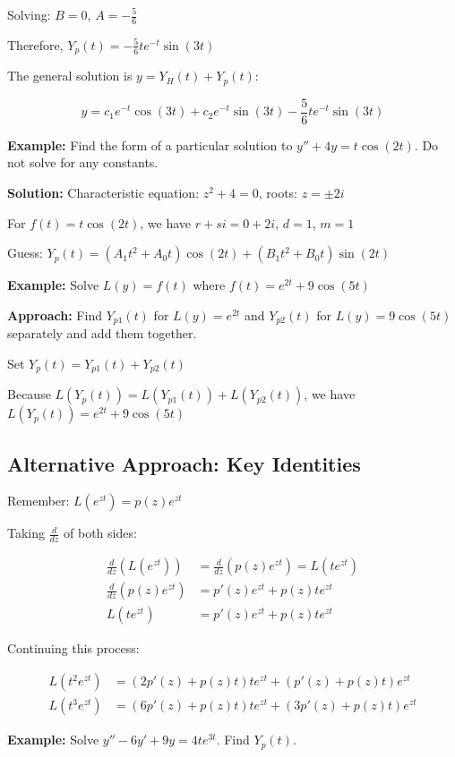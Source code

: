 \documentclass{article}
\begin{document}
Solving: $B = 0$, $A = -\frac{5}{6}$

Therefore, $Y_p(t) = -\frac{5}{6}te^{-t}\sin(3t)$

The general solution is $y = Y_H(t) + Y_p(t)$:

\[y = c_1e^{-t}\cos(3t) + c_2e^{-t}\sin(3t) - \frac{5}{6}te^{-t}\sin(3t)\]

\textbf{Example:} Find the form of a particular solution to $y''+4y = t\cos(2t)$. Do not solve for any constants.

\textbf{Solution:} 
Characteristic equation: $z^2+4 = 0$, roots: $z = \pm 2i$

For $f(t) = t\cos(2t)$, we have $r + si = 0 + 2i$, $d = 1$, $m = 1$

Guess: $Y_p(t) = (A_1t^2 + A_0t)\cos(2t) + (B_1t^2 + B_0t)\sin(2t)$

\textbf{Example:} Solve $L(y) = f(t)$ where $f(t) = e^{2t}+9\cos(5t)$

\textbf{Approach:} Find $Y_{p1}(t)$ for $L(y) = e^{2t}$ and $Y_{p2}(t)$ for $L(y) = 9\cos(5t)$ separately and add them together.

Set $Y_p(t) = Y_{p1}(t) + Y_{p2}(t)$

Because $L(Y_p(t)) = L(Y_{p1}(t)) + L(Y_{p2}(t))$, we have $L(Y_p(t)) = e^{2t} + 9\cos(5t)$

\subsection*{Alternative Approach: Key Identities}

Remember: $L(e^{zt}) = p(z)e^{zt}$

Taking $\frac{d}{dz}$ of both sides:

\begin{align*}
\frac{d}{dz}(L(e^{zt})) &= \frac{d}{dz}(p(z)e^{zt}) = L(te^{zt}) \\
\frac{d}{dz}(p(z)e^{zt}) &= p'(z)e^{zt}+p(z)te^{zt} \\
L(te^{zt}) &= p'(z)e^{zt}+p(z)te^{zt}
\end{align*}

Continuing this process:

\begin{align*}
L(t^2e^{zt}) &= (2p'(z)+p(z)t)te^{zt}+(p'(z)+p(z)t)e^{zt} \\
L(t^3e^{zt}) &= (6p'(z)+p(z)t)te^{zt}+(3p'(z)+p(z)t)e^{zt}
\end{align*}

\textbf{Example:} Solve $y'' - 6y' + 9y = 4te^{3t}$. Find $Y_p(t)$.
\end{document}
